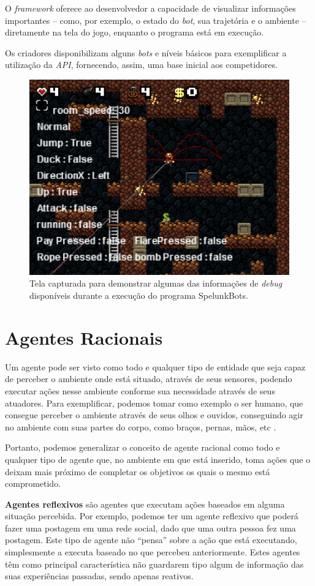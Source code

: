 O \textit{framework} oferece ao desenvolvedor a capacidade de visualizar
informações importantes -- como, por exemplo, o estado do \textit{bot}, sua
trajetória e o ambiente -- diretamente na tela do jogo, enquanto o programa
está em execução.

Os criadores disponibilizam alguns \textit{bots} e níveis básicos para
exemplificar a utilização da \textit{API}, fornecendo, assim, uma base inicial
aos competidores.

\begin{figure}[htb!]
\centering\includegraphics[width=.65\textwidth]{fig/spelunkbots-debug-screen.png}
\caption {\label{fig:spelunkbots-debug-screen}Tela capturada para demonstrar
algumas das informações de \textit{debug} disponíveis durante a execução do
programa SpelunkBots.} \end{figure}


\section{Agentes Racionais}
Um agente pode ser visto como todo e qualquer tipo de entidade que seja capaz
de perceber o ambiente onde está situado, através de seus sensores, podendo
executar ações nesse ambiente conforme sua necessidade através de seus
atuadores.\cite{Russell:1995:AIM:193191} Para exemplificar, podemos tomar como
exemplo o ser humano, que consegue perceber o ambiente através de seus olhos e
ouvidos, conseguindo agir no ambiente com suas partes do corpo, como braços,
pernas, mãos, etc \cite{Russell:1995:AIM:193191}.

Portanto, podemos generalizar o conceito de agente racional como todo e
qualquer tipo de agente que, no ambiente em que está inserido, toma ações que o
deixam mais próximo de completar os objetivos os quais o mesmo está
comprometido.

\textbf{Agentes reflexivos} são agentes que executam ações baseados em alguma
situação percebida. Por exemplo, podemos ter um agente reflexivo que poderá
fazer uma postagem em uma rede social, dado que uma outra pessoa fez uma
postagem. Este tipo de agente não ``pensa'' sobre a ação que está executando,
simplesmente a executa baseado no que percebeu anteriormente. Estes agentes têm
como principal característica não guardarem tipo algum de informação das suas
experiências passadas, sendo apenas reativos.

